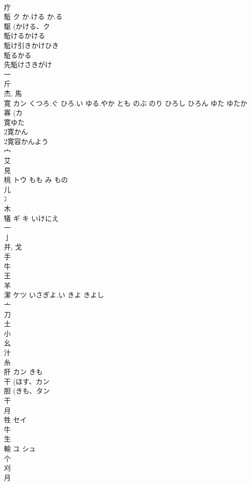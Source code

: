 \documentclass[8pt]{extreport}
\begin{document}
\begin{CJK}{UTF8}{min}
\\	疔 
\\	駈	ク	か.ける か.る	
\\	駆 (かける、ク 
\\	駈けるかける 
\\	駈け引きかけひき 
\\	駈るかる 
\\	先駈けさきがけ 
\\	一 
\\	斤 
\\	杰, 馬 
\\	寛	カン	くつろ.ぐ ひろ.い ゆる.やか とも のぶ のり ひろし ひろん ゆた ゆたか	
\\	寡 (カ 
\\	寛ゆた
\\	2寛かん
\\	2寛容かんよう
\\	宀 
\\	艾 
\\	見 
\\	桃	トウ	もも み もの	
\\	儿 
\\	冫 
\\	木 
\\	犠	ギ キ	いけにえ	
\\	一 
\\	亅 
\\	并, 戈 
\\	手 
\\	牛 
\\	王 
\\	羊 
\\	潔	ケツ	いさぎよ.い きよ きよし	
\\	亠 
\\	刀 
\\	土 
\\	小 
\\	幺 
\\	汁 
\\	糸 
\\	肝	カン	きも	
\\	干 (ほす、カン 
\\	胆 (きも、タン 
\\	干 
\\	月 
\\	牲	セイ		
\\	牛 
\\	生 
\\	輸	ユ シュ		
\\	个 
\\	刈 
\\	月 

\end{CJK}
\end{document}
